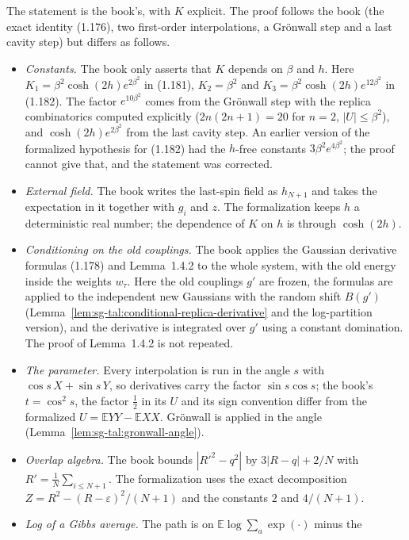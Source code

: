 \begin{remark}
\label{rem:sg-tal:dev-168}
The statement is the book's, with $K$ explicit.  The proof follows the book (the exact identity (1.176),
two first-order interpolations, a Gr\"onwall step and a last cavity step) but differs as follows.
\begin{itemize}
\item \emph{Constants.}  The book only asserts that $K$ depends on $\beta$ and $h$.  Here
  $K_1=\beta^2\cosh(2h)e^{2\beta^2}$ in (1.181), $K_2=\beta^2$ and $K_3=\beta^2\cosh(2h)e^{12\beta^2}$ in (1.182).
  The factor $e^{10\beta^2}$ comes from the Gr\"onwall step with the replica combinatorics computed
  explicitly ($2n(2n+1)=20$ for $n=2$, $|U|\le\beta^2$), and $\cosh(2h)e^{2\beta^2}$ from the last cavity
  step.  An earlier version of the formalized hypothesis for (1.182) had the $h$-free constants
  $3\beta^2e^{4\beta^2}$; the proof cannot give that, and the statement was corrected.
\item \emph{External field.}  The book writes the last-spin field as $h_{N+1}$ and takes the expectation
  in it together with $g_i$ and $z$.  The formalization keeps $h$ a deterministic real number; the
  dependence of $K$ on $h$ is through $\cosh(2h)$.
\item \emph{Conditioning on the old couplings.}  The book applies the Gaussian derivative formulas (1.178)
  and Lemma~1.4.2 to the whole system, with the old energy inside the weights $w_\tau$.  Here the old
  couplings $g'$ are frozen, the formulas are applied to the independent new Gaussians with the
  random shift $B(g')$ (Lemma~\ref{lem:sg-tal:conditional-replica-derivative} and the log-partition
  version), and the derivative is integrated over $g'$ using a constant domination.  The proof of
  Lemma~1.4.2 is not repeated.
\item \emph{The parameter.}  Every interpolation is run in the angle $s$ with $\cos s\,X+\sin s\,Y$, so
  derivatives carry the factor $\sin s\cos s$; the book's $t=\cos^2 s$, the factor $\frac12$ in its $U$ and
  its sign convention differ from the formalized $U=\mathbb E YY-\mathbb E XX$.  Gr\"onwall is applied in
  the angle (Lemma~\ref{lem:sg-tal:gronwall-angle}).
\item \emph{Overlap algebra.}  The book bounds $|R'^2-q^2|$ by $3|R-q|+2/N$ with $R'=\frac1N\sum_{i\le N+1}$.
  The formalization uses the exact decomposition $Z=R^2-(R-\varepsilon)^2/(N+1)$ and the
  constants $2$ and $4/(N+1)$.
\item \emph{Log of a Gibbs average.}  The path is on $\mathbb E\log\sum_a\exp(\cdot)$ minus the

\end{itemize}
\end{remark}
